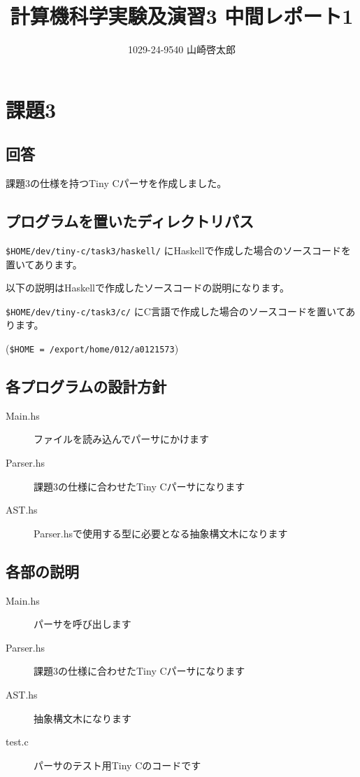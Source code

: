 \documentclass[a4paper,12pt]{jarticle}
\title{計算機科学実験及演習3 中間レポート1}
\author{1029-24-9540 山崎啓太郎}
\begin{document}
\lstset{numbers=left,basicstyle=\small}
\maketitle

\section{課題3}
\subsection{回答}
課題3の仕様を持つTiny Cパーサを作成しました。

\subsection{プログラムを置いたディレクトリパス}
\verb|$HOME/dev/tiny-c/task3/haskell/| にHaskellで作成した場合のソースコードを置いてあります。

以下の説明はHaskellで作成したソースコードの説明になります。

\verb|$HOME/dev/tiny-c/task3/c/| にC言語で作成した場合のソースコードを置いてあります。

(\verb|$HOME = /export/home/012/a0121573|)

\subsection{各プログラムの設計方針}
\begin{description}
  \item[Main.hs] ファイルを読み込んでパーサにかけます
  \item[Parser.hs] 課題3の仕様に合わせたTiny Cパーサになります
  \item[AST.hs] Parser.hsで使用する型に必要となる抽象構文木になります
\end{description}

\subsection{各部の説明}
\begin{description}
  \item[Main.hs] パーサを呼び出します
  \item[Parser.hs] 課題3の仕様に合わせたTiny Cパーサになります
  \item[AST.hs] 抽象構文木になります
  \item[test.c] パーサのテスト用Tiny Cのコードです
\end{description}
\end{document}
